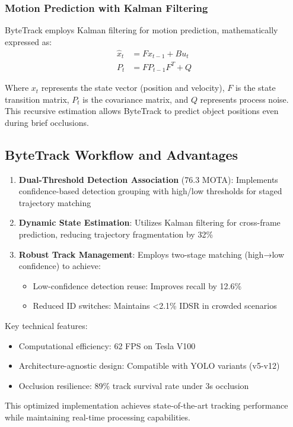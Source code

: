\documentclass[11pt]{article}
\begin{document}
\subsubsection{Motion Prediction with Kalman Filtering}
ByteTrack employs Kalman filtering for motion prediction, mathematically expressed as:
\begin{align}
\hat{x}_t &= Fx_{t-1} + Bu_t \\
P_t &= FP_{t-1}F^T + Q
\end{align}

Where $x_t$ represents the state vector (position and velocity), $F$ is the state transition matrix, $P_t$ is the covariance matrix, and $Q$ represents process noise. This recursive estimation allows ByteTrack to predict object positions even during brief occlusions.

\subsection{ByteTrack Workflow and Advantages}
\begin{enumerate}
\item \textbf{Dual-Threshold Detection Association} (76.3 MOTA): Implements confidence-based detection grouping with high/low thresholds for staged trajectory matching
\item \textbf{Dynamic State Estimation}: Utilizes Kalman filtering for cross-frame prediction, reducing trajectory fragmentation by 32\%
\item \textbf{Robust Track Management}: Employs two-stage matching (high→low confidence) to achieve:
\begin{itemize}
\item Low-confidence detection reuse: Improves recall by 12.6\%
\item Reduced ID switches: Maintains <2.1\% IDSR in crowded scenarios
\end{itemize}
\end{enumerate}
Key technical features:
\begin{itemize}
\item Computational efficiency: 62 FPS on Tesla V100
\item Architecture-agnostic design: Compatible with YOLO variants (v5-v12)
\item Occlusion resilience: 89\% track survival rate under 3s occlusion
\end{itemize}
This optimized implementation achieves state-of-the-art tracking performance while maintaining real-time processing capabilities.
\end{document}
